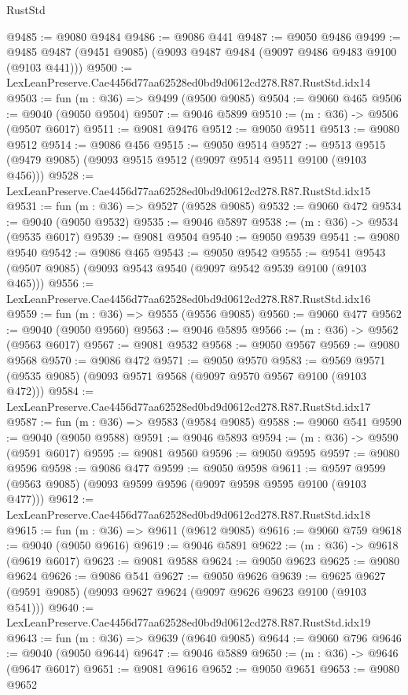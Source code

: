 \begin{lexlean}{RustStd}
\begin{coremodule}
{{@9485 := @9080 @9484
@9486 := @9086 @441
@9487 := @9050 @9486
@9499 := @9485 @9487 (@9451 @9085) (@9093 @9487 @9484 (@9097 @9486 @9483 @9100 (@9103 @441)))
@9500 := LexLeanPreserve.Cae4456d77aa62528ed0bd9d0612cd278.R87.RustStd.idx14
@9503 := fun (m : @36) => @9499 (@9500 @9085)
@9504 := @9060 @465
@9506 := @9040 (@9050 @9504)
@9507 := @9046 @5899
@9510 := (m : @36) -> @9506 (@9507 @6017)
@9511 := @9081 @9476
@9512 := @9050 @9511
@9513 := @9080 @9512
@9514 := @9086 @456
@9515 := @9050 @9514
@9527 := @9513 @9515 (@9479 @9085) (@9093 @9515 @9512 (@9097 @9514 @9511 @9100 (@9103 @456)))
@9528 := LexLeanPreserve.Cae4456d77aa62528ed0bd9d0612cd278.R87.RustStd.idx15
@9531 := fun (m : @36) => @9527 (@9528 @9085)
@9532 := @9060 @472
@9534 := @9040 (@9050 @9532)
@9535 := @9046 @5897
@9538 := (m : @36) -> @9534 (@9535 @6017)
@9539 := @9081 @9504
@9540 := @9050 @9539
@9541 := @9080 @9540
@9542 := @9086 @465
@9543 := @9050 @9542
@9555 := @9541 @9543 (@9507 @9085) (@9093 @9543 @9540 (@9097 @9542 @9539 @9100 (@9103 @465)))
@9556 := LexLeanPreserve.Cae4456d77aa62528ed0bd9d0612cd278.R87.RustStd.idx16
@9559 := fun (m : @36) => @9555 (@9556 @9085)
@9560 := @9060 @477
@9562 := @9040 (@9050 @9560)
@9563 := @9046 @5895
@9566 := (m : @36) -> @9562 (@9563 @6017)
@9567 := @9081 @9532
@9568 := @9050 @9567
@9569 := @9080 @9568
@9570 := @9086 @472
@9571 := @9050 @9570
@9583 := @9569 @9571 (@9535 @9085) (@9093 @9571 @9568 (@9097 @9570 @9567 @9100 (@9103 @472)))
@9584 := LexLeanPreserve.Cae4456d77aa62528ed0bd9d0612cd278.R87.RustStd.idx17
@9587 := fun (m : @36) => @9583 (@9584 @9085)
@9588 := @9060 @541
@9590 := @9040 (@9050 @9588)
@9591 := @9046 @5893
@9594 := (m : @36) -> @9590 (@9591 @6017)
@9595 := @9081 @9560
@9596 := @9050 @9595
@9597 := @9080 @9596
@9598 := @9086 @477
@9599 := @9050 @9598
@9611 := @9597 @9599 (@9563 @9085) (@9093 @9599 @9596 (@9097 @9598 @9595 @9100 (@9103 @477)))
@9612 := LexLeanPreserve.Cae4456d77aa62528ed0bd9d0612cd278.R87.RustStd.idx18
@9615 := fun (m : @36) => @9611 (@9612 @9085)
@9616 := @9060 @759
@9618 := @9040 (@9050 @9616)
@9619 := @9046 @5891
@9622 := (m : @36) -> @9618 (@9619 @6017)
@9623 := @9081 @9588
@9624 := @9050 @9623
@9625 := @9080 @9624
@9626 := @9086 @541
@9627 := @9050 @9626
@9639 := @9625 @9627 (@9591 @9085) (@9093 @9627 @9624 (@9097 @9626 @9623 @9100 (@9103 @541)))
@9640 := LexLeanPreserve.Cae4456d77aa62528ed0bd9d0612cd278.R87.RustStd.idx19
@9643 := fun (m : @36) => @9639 (@9640 @9085)
@9644 := @9060 @796
@9646 := @9040 (@9050 @9644)
@9647 := @9046 @5889
@9650 := (m : @36) -> @9646 (@9647 @6017)
@9651 := @9081 @9616
@9652 := @9050 @9651
@9653 := @9080 @9652
}}
\end{coremodule}
\end{lexlean}
